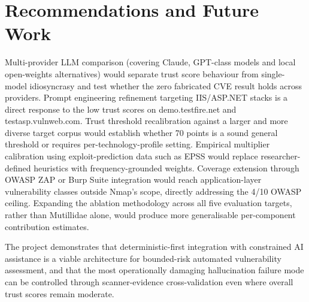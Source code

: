 \documentclass[12pt, a4paper, oneside]{report}
\begin{document}
\section{Recommendations and Future Work}
\label{sec:ch5-future}

Multi-provider LLM comparison (covering Claude, GPT-class models and local open-weights alternatives) would separate trust score behaviour from single-model idiosyncrasy and test whether the zero fabricated CVE result holds across providers. Prompt engineering refinement targeting IIS/ASP.NET stacks is a direct response to the low trust scores on demo.testfire.net and testasp.vulnweb.com. Trust threshold recalibration against a larger and more diverse target corpus would establish whether 70 points is a sound general threshold or requires per-technology-profile setting. Empirical multiplier calibration using exploit-prediction data such as EPSS would replace researcher-defined heuristics with frequency-grounded weights. Coverage extension through OWASP ZAP or Burp Suite integration would reach application-layer vulnerability classes outside Nmap's scope, directly addressing the 4/10 OWASP ceiling. Expanding the ablation methodology across all five evaluation targets, rather than Mutillidae alone, would produce more generalisable per-component contribution estimates.

The project demonstrates that deterministic-first integration with constrained AI assistance is a viable architecture for bounded-risk automated vulnerability assessment, and that the most operationally damaging hallucination failure mode can be controlled through scanner-evidence cross-validation even where overall trust scores remain moderate.


\printbibliography[heading=bibintoc, title={Bibliography}]

\end{document}
